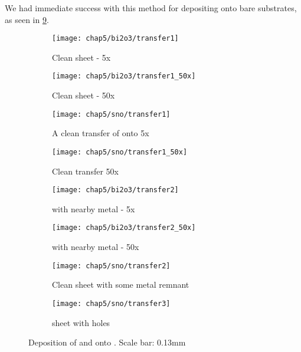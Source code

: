 \documentclass[../Matt_Gebert_Honours_Thesis.tex]{subfiles}
\begin{document}
	We had immediate success with this method for depositing onto bare substrates, as seen in \cref{fig:transfer_bi&sno_on_si}.
	\begin{figure}[H]
		\begin{subfigure}[t]{0.24\textwidth}
			\centering
			\texttt{[image: chap5/bi2o3/transfer1]}
			\caption{Clean \bismuthoxide{} sheet - 5x}\label{fig:bi2o3_1}
		\end{subfigure}
		\begin{subfigure}[t]{0.24\textwidth}
			\centering
			\texttt{[image: chap5/bi2o3/transfer1\_50x]}
			\caption{Clean \bismuthoxide{} sheet - 50x}\label{fig:bi2o3_2}
		\end{subfigure}
		\begin{subfigure}[t]{0.24\textwidth}
			\centering
			\texttt{[image: chap5/sno/transfer1]}
			\caption[\tinoxide{} transfer on \silicondioxide{}]{A clean transfer of \tinoxide{} onto \silicondioxide{} 5x}\label{fig:sno_1}
		\end{subfigure}
		\begin{subfigure}[t]{0.24\textwidth}
			\centering
			\texttt{[image: chap5/sno/transfer1\_50x]}
			\caption{Clean \tinoxide{} transfer 50x}\label{fig:sno_2}
		\end{subfigure}
		\begin{subfigure}[t]{0.24\textwidth}
			\centering
			\texttt{[image: chap5/bi2o3/transfer2]}
			\caption{\bismuthoxide{} with nearby metal - 5x}\label{fig:bi2o3_3}
		\end{subfigure}
		\begin{subfigure}[t]{0.24\textwidth}
			\centering
			\texttt{[image: chap5/bi2o3/transfer2\_50x]}
			\caption{\bismuthoxide{} with nearby metal - 50x}\label{fig:bi2o3_4}
		\end{subfigure}
		\begin{subfigure}[t]{0.24\textwidth}
			\centering
			\texttt{[image: chap5/sno/transfer2]}
			\caption{Clean \tinoxide{} sheet with some metal remnant}\label{fig:sno_3}
		\end{subfigure}
		\begin{subfigure}[t]{0.24\textwidth}
			\centering
			\texttt{[image: chap5/sno/transfer3]}
			\caption{\tinoxide{} sheet with holes}\label{fig:sno_4}
		\end{subfigure}
		\caption[\bismuthoxide{} and \tinoxide{} printing on \silicondioxide{}]{Deposition of \bismuthoxide{} and \tinoxide{} onto \silicondioxide{}. Scale bar: 0.13mm}\label{fig:transfer_bi&sno_on_si}
	\end{figure}
	
\end{document}
